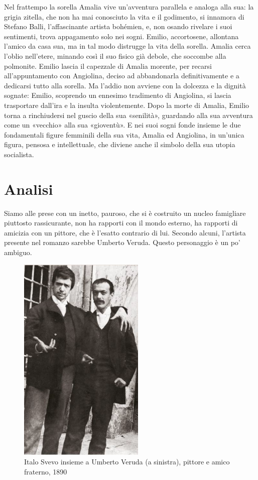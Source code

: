 \documentclass[a4paper, twoside, titlepage]{book}
\begin{document}
Nel frattempo la sorella Amalia vive un'avventura parallela e analoga alla sua: la grigia zitella, che non ha mai conosciuto la vita e il godimento, si innamora di Stefano Balli, l'affascinante artista bohémien, e, non osando rivelare i suoi sentimenti, trova appagamento solo nei sogni. Emilio, accortosene, allontana l'amico da casa sua, ma in tal modo distrugge la vita della sorella. Amalia cerca l'oblio nell'etere, minando così il suo fisico già debole, che soccombe alla polmonite. Emilio lascia il capezzale di Amalia morente, per recarsi all'appuntamento con Angiolina, deciso ad abbandonarla definitivamente e a dedicarsi tutto alla sorella. Ma l'addio non avviene con la dolcezza e la dignità sognate: Emilio, scoprendo un ennesimo tradimento di Angiolina, si lascia trasportare dall'ira e la insulta violentemente. Dopo la morte di Amalia, Emilio torna a rinchiudersi nel guscio della sua «senilità», guardando alla sua avventura come un «vecchio» alla sua «gioventù». E nei suoi sogni fonde insieme le due fondamentali figure femminili della sua vita, Amalia ed Angiolina, in un'unica figura, pensosa e intellettuale, che diviene anche il simbolo della sua utopia socialista.

\section{Analisi}
Siamo alle prese con un inetto, pauroso, che si è costruito un nucleo famigliare piuttosto rassicurante, non ha rapporti con il mondo esterno, ha rapporti di amicizia con un pittore, che è l'esatto contrario di lui. Secondo alcuni, l'artista presente nel romanzo sarebbe Umberto Veruda. Questo personaggio è un po' ambiguo.

\begin{figure}
\begin{center}
\includegraphics[width=6cm]{veruda}
\end{center}
\caption{Italo Svevo insieme a Umberto Veruda (a sinistra), pittore e amico fraterno, 1890}
\end{figure}
\end{document}
